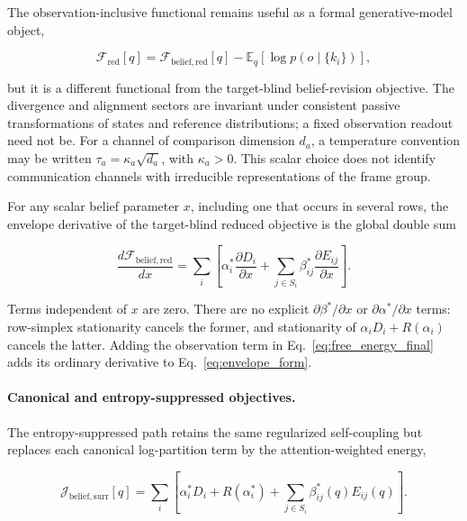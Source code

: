 \documentclass[twoside,11pt]{article}
\begin{document}
The observation-inclusive functional remains useful as a formal generative-model object,

\begin{equation}
\mathcal{F}_{\mathrm{red}}[q]
=\mathcal{F}_{\mathrm{belief,red}}[q]
-\mathbb{E}_q[\log p(o\mid\{k_i\})],
\label{eq:free_energy_final}
\end{equation}

but it is a different functional from the target-blind belief-revision objective. The divergence and alignment sectors are invariant under consistent passive transformations of states and reference distributions; a fixed observation readout need not be. For a channel of comparison dimension $d_a$, a temperature convention may be written $\tau_a=\kappa_a\sqrt{d_a}$, with $\kappa_a>0$. This scalar choice does not identify communication channels with irreducible representations of the frame group.

For any scalar belief parameter $x$, including one that occurs in several rows, the envelope derivative of the target-blind reduced objective is the global double sum

\begin{equation}
\frac{d\mathcal{F}_{\mathrm{belief,red}}}{dx}
=\sum_i\left[
\alpha_i^*\frac{\partial D_i}{\partial x}
+\sum_{j\in S_i}\beta_{ij}^*\frac{\partial E_{ij}}{\partial x}
\right].
\label{eq:envelope_form}
\end{equation}

Terms independent of $x$ are zero. There are no explicit $\partial\beta^*/\partial x$ or $\partial\alpha^*/\partial x$ terms: row-simplex stationarity cancels the former, and stationarity of $\alpha_iD_i+R(\alpha_i)$ cancels the latter. Adding the observation term in Eq.~\eqref{eq:free_energy_final} adds its ordinary derivative to Eq.~\eqref{eq:envelope_form}.

\paragraph{Canonical and entropy-suppressed objectives.} The entropy-suppressed path retains the same regularized self-coupling but replaces each canonical log-partition term by the attention-weighted energy,

\begin{equation}
\mathcal{J}_{\mathrm{belief,surr}}[q]
=\sum_i\left[
\alpha_i^*D_i+R(\alpha_i^*)
+\sum_{j\in S_i}\beta_{ij}^*(q)E_{ij}(q)
\right].
\label{eq:canonical_surrogate_objectives}
\end{equation}
\end{document}
